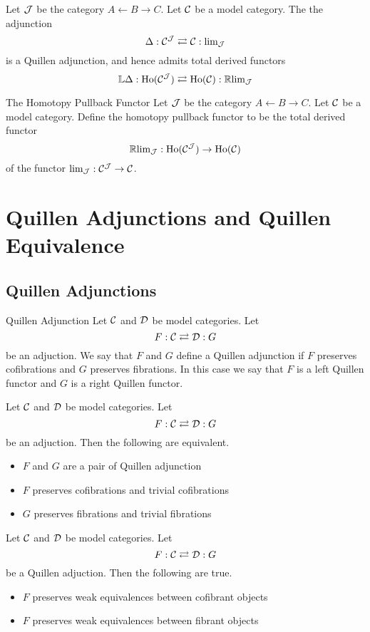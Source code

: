 \documentclass[a4paper]{article}
\begin{document}
\begin{thm}{}{} Let $\mathcal{J}$ be the category $A\leftarrow B\rightarrow C$. Let $\mathcal{C}$ be a model category. The the adjunction $$\Delta:\mathcal{C}^{\mathcal{J}}\rightleftarrows\mathcal{C}:\text{lim}_{\mathcal{J}}$$ is a Quillen adjunction, and hence admits total derived functors $$\mathbb{L}\Delta:\text{Ho}(\mathcal{C}^{\mathcal{J}})\rightleftarrows\text{Ho}(\mathcal{C}):\mathbb{R}\text{lim}_{\mathcal{J}}$$
\end{thm}

\begin{defn}{The Homotopy Pullback Functor}{} Let $\mathcal{J}$ be the category $A\leftarrow B\rightarrow C$. Let $\mathcal{C}$ be a model category. Define the homotopy pullback functor to be the total derived functor $$\mathbb{R}\text{lim}_{\mathcal{J}}:\text{Ho}(\mathcal{C}^{\mathcal{J}})\to\text{Ho}(\mathcal{C})$$ of the functor $\text{lim}_{\mathcal{J}}:\mathcal{C}^{\mathcal{J}}\to\mathcal{C}$. 
\end{defn}

\pagebreak
\section{Quillen Adjunctions and Quillen Equivalence}
\subsection{Quillen Adjunctions}
\begin{defn}{Quillen Adjunction}{} Let $\mathcal{C}$ and $\mathcal{D}$ be model categories. Let $$F:\mathcal{C}\rightleftarrows\mathcal{D}:G$$ be an adjuction. We say that $F$ and $G$ define a Quillen adjunction if $F$ preserves cofibrations and $G$ preserves fibrations. In this case we say that $F$ is a left Quillen functor and $G$ is a right Quillen functor. 
\end{defn}

\begin{thm}{}{} Let $\mathcal{C}$ and $\mathcal{D}$ be model categories. Let $$F:\mathcal{C}\rightleftarrows\mathcal{D}:G$$ be an adjuction. Then the following are equivalent. 
\begin{itemize}
\item $F$ and $G$ are a pair of Quillen adjunction
\item $F$ preserves cofibrations and trivial cofibrations
\item $G$ preserves fibrations and trivial fibrations
\end{itemize}
\end{thm}

\begin{prp}{}{} Let $\mathcal{C}$ and $\mathcal{D}$ be model categories. Let $$F:\mathcal{C}\rightleftarrows\mathcal{D}:G$$ be a Quillen adjuction. Then the following are true. 
\begin{itemize}
\item $F$ preserves weak equivalences between cofibrant objects
\item $F$ preserves weak equivalences between fibrant objects
\end{itemize}
\end{prp}
\end{document}
